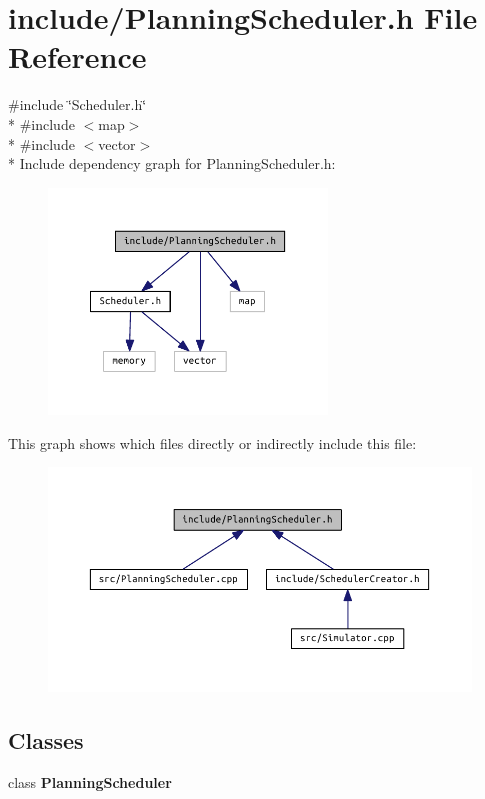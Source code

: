 \section{include/\+Planning\+Scheduler.h File Reference}
\label{_planning_scheduler_8h}
{\ttfamily \#include \char`\"{}Scheduler.\+h\char`\"{}}\\*
{\ttfamily \#include $<$map$>$}\\*
{\ttfamily \#include $<$vector$>$}\\*
Include dependency graph for Planning\+Scheduler.\+h\+:
\nopagebreak
\begin{figure}[H]
\begin{center}
\leavevmode
\includegraphics[width=210pt]{_planning_scheduler_8h__incl}
\end{center}
\end{figure}
This graph shows which files directly or indirectly include this file\+:
\nopagebreak
\begin{figure}[H]
\begin{center}
\leavevmode
\includegraphics[width=330pt]{_planning_scheduler_8h__dep__incl}
\end{center}
\end{figure}
\subsection*{Classes}
\begin{DoxyCompactItemize}
\item 
class {\bf Planning\+Scheduler}
\end{DoxyCompactItemize}
